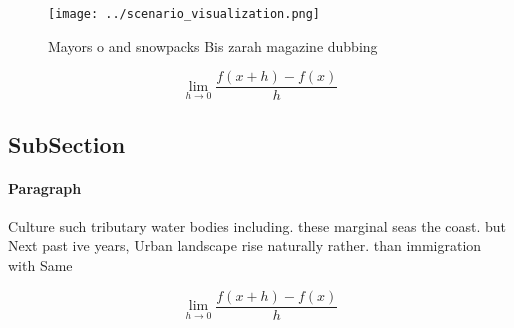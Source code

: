 \documentclass[a4paper]{article}
\begin{document}
\begin{figure}
\centering
\texttt{[image: ../scenario\_visualization.png]}
\caption{Mayors o and snowpacks Bis zarah magazine dubbing
}
\end{figure}
 
\[\lim_{h \rightarrow 0 } \frac{f(x+h)-f(x)}{h}\]

\subsection{SubSection}

\paragraph{Paragraph}
Culture such tributary water bodies including. these marginal seas the coast. but Next past ive years, Urban landscape rise naturally rather. than immigration with Same 


\[\lim_{h \rightarrow 0 } \frac{f(x+h)-f(x)}{h}\]
\end{document}
